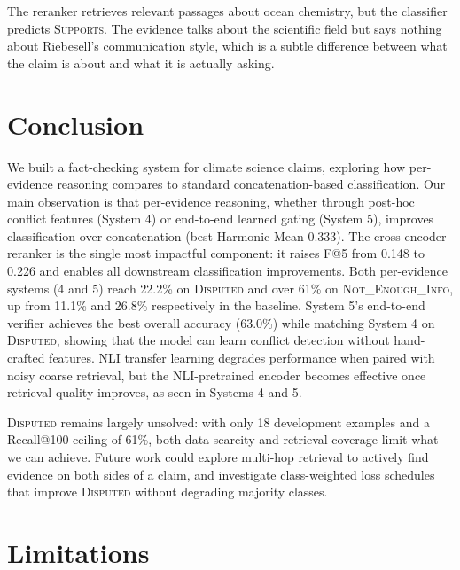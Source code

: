 \documentclass[11pt]{article}
\begin{document}
The reranker retrieves relevant passages about ocean chemistry, but the
classifier predicts \textsc{Supports}.
The evidence talks about the scientific field but says nothing about
Riebesell's communication style, which is a subtle difference between what
the claim is about and what it is actually asking.

\section{Conclusion}

We built a fact-checking system for climate science claims, exploring
how per-evidence reasoning compares to standard concatenation-based
classification.
Our main observation is that per-evidence reasoning, whether through
post-hoc conflict features (System 4) or end-to-end learned gating
(System 5), improves classification over concatenation (best
Harmonic Mean 0.333).
The cross-encoder reranker is the single most impactful component:
it raises F@5 from 0.148 to 0.226 and enables all downstream
classification improvements.
Both per-evidence systems (4 and 5) reach 22.2\% on \textsc{Disputed}
and over 61\% on \textsc{Not\_Enough\_Info}, up from 11.1\% and 26.8\%
respectively in the baseline.
System 5's end-to-end verifier achieves the best overall accuracy
(63.0\%) while matching System 4 on \textsc{Disputed}, showing that
the model can learn conflict detection without hand-crafted features.
NLI transfer learning degrades performance when paired with noisy
coarse retrieval, but the NLI-pretrained encoder becomes effective
once retrieval quality improves, as seen in Systems 4 and 5.

\textsc{Disputed} remains largely unsolved: with only 18 development
examples and a Recall@100 ceiling of 61\%, both data scarcity and
retrieval coverage limit what we can achieve.
Future work could explore multi-hop retrieval to actively find evidence
on both sides of a claim, and investigate class-weighted loss schedules
that improve \textsc{Disputed} without degrading majority classes.

\section*{Limitations}
\end{document}
